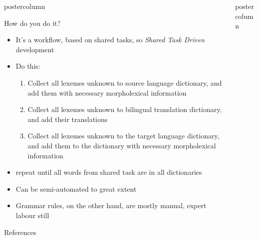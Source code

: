 \documentclass[final,hyperref={pdfpagelabels}]{beamer}
\newlength{\columnheight}
\begin{document}
\begin{frame}
\begin{columns}
\begin{column}{.49\textwidth}
\begin{beamercolorbox}[center,wd=\textwidth]{postercolumn}
\begin{minipage}[T]{.95\textwidth}
{        \begin{block}{How do you do it?}
            \begin{itemize}
                \item It's a workflow, based on shared tasks, so
                    \textit{Shared Task Driven} development
                \item Do this:
                \begin{enumerate}
                    \item Collect all lexemes unknown to source language
                        dictionary, and add them with necessary morpholexical
                        information
                    \item Collect all lexemes unknown to bilingual translation
                        dictionary, and add their translations
                    \item Collect all lexemes unknown to the target language
                        dictionary, and add them to the dictionary with
                        necessary morpholexical information
                \end{enumerate}
            \item repeat until all words from shared task are in all
                dictionaries
            \item Can be semi-automated to great extent
            \item Grammar rules, on the other hand, are mostly manual, expert
                labour still
            \end{itemize}
        \end{block}
        \begin{block}{References}
            \small
            
            
        \end{block}
         }
        \end{minipage}
      \end{beamercolorbox}
  \end{column}

   \begin{column}{.49\textwidth}
      \begin{beamercolorbox}[center,wd=\textwidth]{postercolumn}
        \begin{minipage}[T]{.95\textwidth} %
          \parbox[t][\columnheight]{\textwidth}{%

}
\end{minipage}
\end{beamercolorbox}
\end{column}
\end{columns}
\end{frame}
\end{document}
